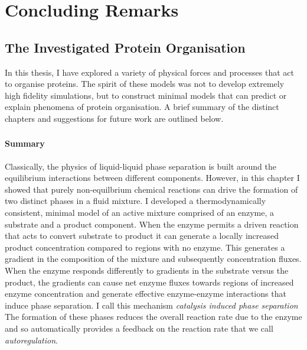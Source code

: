 \chapter{\label{ch:4-conc}Concluding Remarks} 

\minitoc

\newpage

\section{The Investigated Protein Organisation}

In this thesis, I have explored a variety of physical forces and processes that act to organise proteins. The spirit of these models was not to develop extremely high fidelity simulations, but to construct minimal models that can predict or explain phenomena of protein organisation. A brief summary of the distinct chapters and suggestions for future work are outlined below.

\subsection{\chcips}

\subsubsection{Summary}
Classically, the physics of liquid-liquid phase separation is built around the equilibrium interactions between different components. However, in this chapter I showed that purely non-equilbrium chemical reactions can drive the formation of two distinct phases in a fluid mixture. I developed a thermodynamically consistent, minimal model of an active mixture comprised of an enzyme, a substrate and a product component. When the enzyme permits a driven reaction that acts to convert substrate to product it can generate a locally increased product concentration compared to regions with no enzyme. This generates a gradient in the composition of the mixture and subsequently concentration fluxes. When the enzyme responds differently to gradients in the substrate versus the product, the gradients can cause net enzyme fluxes towards regions of increased enzyme concentration and generate effective enzyme-enzyme interactions that induce phase separation. I call this mechanism \textit{catalysis induced phase separation} The formation of these phases reduces the overall reaction rate due to the enzyme and so automatically provides a feedback on the reaction rate that we call \textit{autoregulation}.

